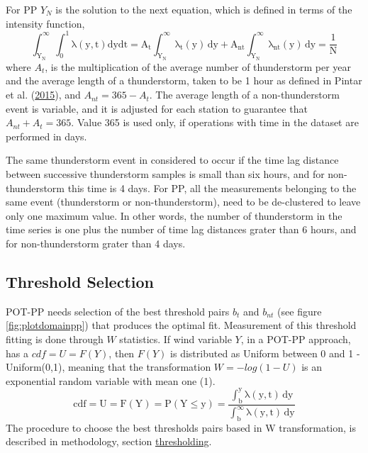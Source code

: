 \documentclass[12pt,oneside]{reedthesis}
\begin{document}
For PP \(Y_N\) is the solution to the next equation, which is defined in terms of the intensity function,
\begin{equation}
  \mathrm{
          \int_{Y_N}^{\infty}\int_0^1\lambda\left( y,t\right)dydt = A_t\int_{Y_N}^{\infty}\lambda_t\left( y\right)\,dy + A_{nt}\int_{Y_N}^{\infty}\lambda_{nt}\left( y\right)\,dy = \frac{1}{N}
         }
  \label{eq:pprl}
\end{equation}
where \(A_t\), is the multiplication of the average number of thunderstorm per year and the average length of a thunderstorm, taken to be 1 hour as defined in Pintar et al. (\protect\hyperlink{ref-Pintar2015}{2015}), and \(A_{nt} = 365 - A_t\). The average length of a non-thunderstorm event is variable, and it is adjusted for each station to guarantee that \(A_{nt} + A_t = 365\). Value 365 is used only, if operations with time in the dataset are performed in days.

The same thunderstorm event in considered to occur if the time lag distance between successive thunderstorm samples is small than six hours, and for non-thunderstorm this time is 4 days. For PP, all the measurements belonging to the same event (thunderstorm or non-thunderstorm), need to be de-clustered to leave only one maximum value. In other words, the number of thunderstorm in the time series is one plus the number of time lag distances grater than 6 hours, and for non-thunderstorm grater than 4 days.

\hypertarget{thresholdselection}{%
\subsection{Threshold Selection}\label{thresholdselection}}

POT-PP needs selection of the best threshold pairs \(b_t\) and \(b_{nt}\) (see figure \ref{fig:plotdomainpp}) that produces the optimal fit. Measurement of this threshold fitting is done through \(W\) statistics. If wind variable \(Y\), in a POT-PP approach, has a \(cdf = U = F(Y)\), then \(F(Y)\) is distributed as Uniform between 0 and 1 - Uniform(0,1), meaning that the transformation \(W = -log(1-U)\) is an exponential random variable with mean one (1).
\begin{equation}
  \mathrm{
            cdf = U= F(Y) = P(Y \leq y) = \frac{\int_b^y\lambda(y,t)\,dy}{\int_b^\infty\lambda(y,t)\,dy} 
         }
  \label{eq:ppcdf}
\end{equation}
The procedure to choose the best thresholds pairs based in W transformation, is described in methodology, section \protect\hyperlink{thresholding}{thresholding}.
\end{document}
